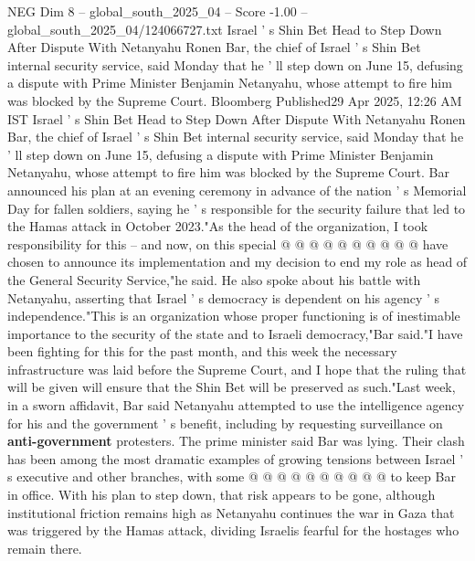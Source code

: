 \begin{textsample}{NEG Dim 8 – global\_south\_2025\_04 – Score -1.00 – global\_south\_2025\_04/124066727.txt}  \label{ex:f8_neg_280}
Israel ' s Shin Bet Head to Step Down After Dispute With Netanyahu Ronen Bar, the chief of Israel ' s Shin Bet internal security service, said Monday that he ' ll step down on June 15, defusing a dispute with Prime Minister Benjamin Netanyahu, whose attempt to fire him was blocked by the Supreme Court.
Bloomberg Published29 Apr 2025, 12:26 AM IST Israel ' s Shin Bet Head to Step Down After Dispute With Netanyahu Ronen Bar, the chief of Israel ' s Shin Bet internal security service, said Monday that he ' ll step down on June 15, defusing a dispute with Prime Minister Benjamin Netanyahu, whose attempt to fire him was blocked by the Supreme Court.
Bar announced his plan at an evening ceremony in advance of the nation ' s Memorial Day for fallen soldiers, saying he ' s responsible for the security failure that led to the Hamas attack in October 2023."As the head of the organization, I took responsibility for this -- and now, on this special @ @ @ @ @ @ @ @ @ @ have chosen to announce its implementation and my decision to end my role as head of the General Security Service,"he said.
He also spoke about his battle with Netanyahu, asserting that Israel ' s democracy is dependent on his agency ' s independence."This is an organization whose proper functioning is of inestimable importance to the security of the state and to Israeli democracy,"Bar said."I have been fighting for this for the past month, and this week the necessary infrastructure was laid before the Supreme Court, and I hope that the ruling that will be given will ensure that the Shin Bet will be preserved as such."Last week, in a sworn affidavit, Bar said Netanyahu attempted to use the intelligence agency for his and the government ' s benefit, including by requesting surveillance on \textbf{anti-government} protesters.
The prime minister said Bar was lying.
Their clash has been among the most dramatic examples of growing tensions between Israel ' s executive and other branches, with some @ @ @ @ @ @ @ @ @ @ to keep Bar in office.
With his plan to step down, that risk appears to be gone, although institutional friction remains high as Netanyahu continues the war in Gaza that was triggered by the Hamas attack, dividing Israelis fearful for the hostages who remain there.

\end{textsample}
